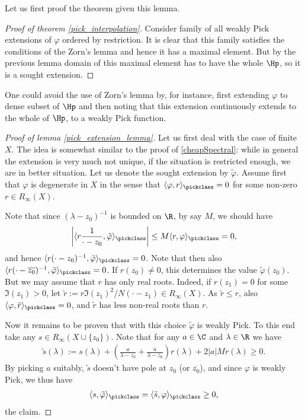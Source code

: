 Let us first proof the theorem given this lemma.

\begin{proof}[Proof of theorem \ref{pick_interpolation}]
	Consider family of all weakly Pick extensions of $\varphi$ ordered by restriction. It is clear that this family satisfies the conditions of the Zorn's lemma and hence it has a maximal element. But by the previous lemma domain of this maximal element has to have the whole $\Hp$, so it is a sought extension.
\end{proof}

One could avoid the use of Zorn's lemma by, for instance, first extending $\varphi$ to dense subset of $\Hp$ and then noting that this extension continuously extends to the whole of $\Hp$, to a weakly Pick function.

\begin{proof}[Proof of lemma \ref{pick_extension_lemma}]
	Let us first deal with the case of finite $X$. The idea is somewhat similar to the proof of \ref{cheapSpectral}: while in general the extension is very much not unique, if the situation is restricted enough, we are in better situation. Let us denote the sought extension by $\tilde{\varphi}$. Assume first that $\varphi$ is degenerate in $X$ in the sense that $\langle \varphi, r\rangle_{\pickclass} = 0$ for some non-zero $r \in R_{\infty}(X)$.

	Note that since $(\lambda - z_{0})^{-1}$ is bounded on $\R$, by say $M$, we should have
	\begin{align*}
		\left|\langle r \frac{1}{\cdot - z_{0}}, \tilde{\varphi} \rangle_{\pickclass}\right| \leq M \langle r , \varphi \rangle_{\pickclass} = 0,
	\end{align*}
	and hence $\langle r (\cdot - z_{0})^{-1}, \tilde{\varphi} \rangle_{\pickclass} = 0$. Note that then also $\langle r (\cdot - \overline{z_{0}})^{-1}, \tilde{\varphi} \rangle_{\pickclass} = 0$. If $r(z_{0}) \neq 0$, this determines the value $\tilde{\varphi}(z_{0})$. But we may assume that $r$ has only real roots. Indeed, if $r(z_{1}) = 0$ for some $\Im(z_{1}) > 0$, let $\tilde{r} := r \Im(z_{1})^2/N(\cdot - z_{1}) \in R_{\infty}(X)$. As $\tilde{r} \leq r$, also  $\langle \varphi, \tilde{r}\rangle_{\pickclass} = 0$, and $\tilde{r}$ has less non-real roots than $r$.

	Now it remains to be proven that with this choice $\tilde{\varphi}$ is weakly Pick. To this end take any $s \in R_{\infty}(X \cup \{z_{0}\})$. Note that for any $a \in \C$ and $\lambda \in \R$ we have
	\begin{align*}
		\tilde{s}(\lambda) := s(\lambda) + \left(\frac{a}{\lambda - z_{0}} + \frac{\overline{a}}{\lambda - \overline{z_{0}}}\right) r(\lambda) + 2 |a| M r(\lambda) \geq 0.
	\end{align*}
	By picking $a$ suitably, $\tilde{s}$ doesn't have pole at $z_{0}$ (or $\overline{z_{0}}$), and since $\varphi$ is weakly Pick, we thus have
	\begin{align*}
		\langle s, \tilde{\varphi} \rangle_{\pickclass} = \langle \tilde{s}, \varphi \rangle_{\pickclass} \geq 0,
	\end{align*}
	the claim.


\end{proof}

